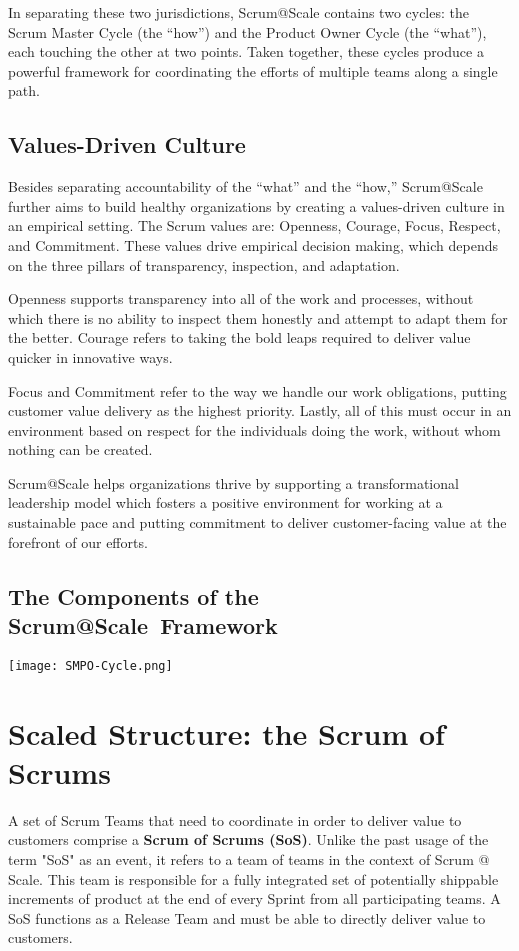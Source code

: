 \documentclass[12pt,a4paper,parskip=full]{scrartcl}
\begin{document}
In separating these two jurisdictions, Scrum@Scale contains two cycles: the Scrum Master Cycle (the ``how'') and the Product Owner Cycle (the ``what''), each touching the other at two points. Taken together, these cycles produce a powerful framework for coordinating the efforts of multiple teams along a single path.

\subsection{Values-Driven Culture}

Besides separating accountability of the ``what'' and the ``how,'' Scrum@Scale further aims to build healthy organizations by creating a values-driven culture in an empirical setting. The Scrum values are: Openness, Courage, Focus, Respect, and Commitment. These values drive empirical decision making, which depends on the three pillars of transparency, inspection, and adaptation.

Openness supports transparency into all of the work and processes, without which there is no ability to inspect them honestly and attempt to adapt them for the better. Courage refers to taking the bold leaps required to deliver value quicker in innovative ways.

Focus and Commitment refer to the way we handle our work obligations, putting customer value delivery as the highest priority. Lastly, all of this must occur in an environment based on respect for the individuals doing the work, without whom nothing can be created.

Scrum@Scale helps organizations thrive by supporting a transformational leadership model which fosters a positive environment for working at a sustainable pace and putting commitment to deliver customer-facing value at the forefront of our efforts.

\subsection{The Components of the Scrum@Scale\textregistered ~Framework}

\texttt{[image: SMPO-Cycle.png]}

\section{Scaled Structure: the Scrum of Scrums}

A set of Scrum Teams that need to coordinate in order to deliver value to customers comprise a \textbf{Scrum of Scrums (SoS)}. Unlike the past usage of the term "SoS" as an event, it refers to a team of teams in the context of Scrum @ Scale. This team is responsible for a fully integrated set of potentially shippable increments of product at the end of every Sprint from all participating teams. A SoS functions as a Release Team and must be able to directly deliver value to customers.
\end{document}
